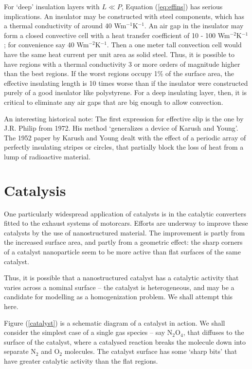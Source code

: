 \documentclass[12pt, a4paper, twoside, openright]{book}
\begin{document}
For `deep' insulation layers with $L \ll P$, Equation (\ref{eq:effins}) has serious implications. An insulator may be constructed with steel components, which has a thermal conductivity of around 40 Wm$^{-1}$K$^{-1}$. An air gap in the insulator may form a closed convective cell with a heat transfer coefficient of 10 - 100 Wm$^{-2}$K$^{-1}$; for convenience say 40 Wm$^{-2}$K$^{-1}$.  Then a one meter tall convection cell would have the same heat current per unit area as solid steel.  Thus, it is possible to have regions with a thermal conductivity 3 or more orders of magnitude higher than the best regions. If the worst regions occupy 1\% of the surface area, the effective insulating length is 10 times worse than if the insulator were constructed purely of a good insulator like polystyrene.
For a deep insulating layer, then, it is critical to eliminate any air gaps that are big enough to allow convection.

\vspace{1em}
An interesting historical note: The first expression for effective slip is the one by J.R. Philip from 1972.  His method `generalizes a device of Karush and Young'.  The 1952 paper by Karush and Young
dealt with the effect of a periodic array of perfectly insulating stripes or circles, that partially block the loss of heat from a lump of radioactive material.

\clearpage
\section{Catalysis}

One particularly widespread application of catalysts is in the catalytic converters fitted to the exhaust systems of motorcars.  Efforts are underway to improve these catalysts by the use of nanostructured material.  The improvement is partly from the increased surface area, and partly from a geometric effect: the sharp corners of a catalyst nanoparticle seem to be more active than flat surfaces of the same catalyst.

Thus, it is possible that a nanostructured catalyst has a catalytic activity that varies across a nominal surface  -- the catalyst is heterogeneous, and may be a candidate for modelling as a homogenization problem.  We shall attempt this here.

\vspace*{1em}
Figure (\ref{catalyst}) is a schematic diagram of a catalyst in action.  We shall consider the simplest case of a single gas species -- say N$_2$O$_4$, that diffuses to the surface of the catalyst, where a catalysed reaction breaks the molecule down into separate N$_2$ and O$_2$ molecules.  The catalyst surface has some `sharp bits' that have greater catalytic activity than the flat regions.
\end{document}
